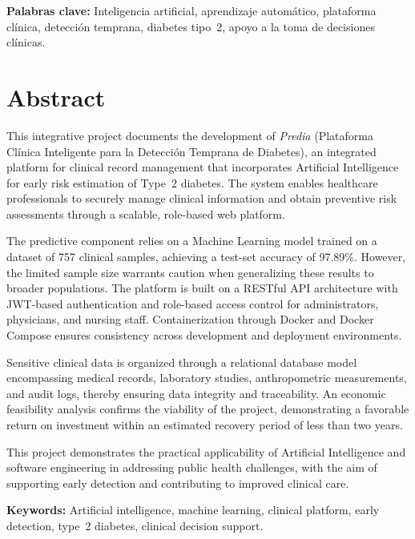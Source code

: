 \documentclass[12pt, letterpaper, twoside]{report}
\begin{document}
\bigskip
\noindent\textbf{Palabras clave:} Inteligencia artificial, aprendizaje automático, plataforma clínica, detección temprana, diabetes tipo~2, apoyo a la toma de decisiones clínicas.

\cleardoublepage
{}
{}
\chapter*{Abstract}

This integrative project documents the development of \textit{Predia} (Plataforma Clínica Inteligente para la Detección Temprana de Diabetes), an integrated platform for clinical record management that incorporates Artificial Intelligence for early risk estimation of Type~2 diabetes. The system enables healthcare professionals to securely manage clinical information and obtain preventive risk assessments through a scalable, role-based web platform.

The predictive component relies on a Machine Learning model trained on a dataset of 757 clinical samples, achieving a test-set accuracy of 97.89\%. However, the limited sample size warrants caution when generalizing these results to broader populations. The platform is built on a RESTful API architecture with JWT-based authentication and role-based access control for administrators, physicians, and nursing staff. Containerization through Docker and Docker Compose ensures consistency across development and deployment environments.

Sensitive clinical data is organized through a relational database model encompassing medical records, laboratory studies, anthropometric measurements, and audit logs, thereby ensuring data integrity and traceability. An economic feasibility analysis confirms the viability of the project, demonstrating a favorable return on investment within an estimated recovery period of less than two years.

This project demonstrates the practical applicability of Artificial Intelligence and software engineering in addressing public health challenges, with the aim of supporting early detection and contributing to improved clinical care.

\bigskip
\noindent\textbf{Keywords:} Artificial intelligence, machine learning, clinical platform, early detection, type~2 diabetes, clinical decision support.

\tableofcontents
\end{document}
